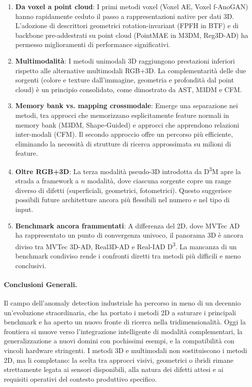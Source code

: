 \begin{enumerate}
    \item \textbf{Da voxel a point cloud}: I primi metodi voxel (Voxel AE, Voxel f-AnoGAN) hanno rapidamente ceduto il passo a rappresentazioni native per dati 3D. L'adozione di descrittori geometrici rotation-invariant (FPFH in BTF) e di backbone pre-addestrati su point cloud (PointMAE in M3DM, Reg3D-AD) ha permesso miglioramenti di performance significativi.

    \item \textbf{Multimodalità}: I metodi unimodali 3D raggiungono prestazioni inferiori rispetto alle alternative multimodali RGB+3D. La complementarità delle due sorgenti (colore e texture dall'immagine, geometria e profondità dal point cloud) è un principio consolidato, come dimostrato da AST, M3DM e CFM.

    \item \textbf{Memory bank vs. mapping crossmodale}: Emerge una separazione nei metodi, tra approcci che memorizzano esplicitamente feature normali in memory bank (M3DM, Shape-Guided) e approcci che apprendono relazioni inter-modali (CFM). Il secondo approccio offre un percorso più efficiente, eliminando la necessità di strutture di ricerca approssimata su milioni di feature.

    \item \textbf{Oltre RGB+3D}: La terza modalità pseudo-3D introdotta da D\textsuperscript{3}M apre la strada a framework a $n$ modalità, dove ciascuna sorgente copre un range diverso di difetti (superficiali, geometrici, fotometrici). Questo suggerisce possibili future architetture ancora più flessibili nel numero e nel tipo di input.

    \item \textbf{Benchmark ancora frammentati}: A differenza del 2D, dove MVTec AD ha rappresentato un punto di convergenza univoco, il panorama 3D è ancora diviso tra MVTec 3D-AD, Real3D-AD e Real-IAD D\textsuperscript{3}. La mancanza di un benchmark condiviso rende i confronti diretti tra metodi più difficili e meno conclusivi.
\end{enumerate}

\paragraph{Conclusioni Generali.}
Il campo dell'anomaly detection industriale ha percorso in meno di un decennio un'evoluzione straordinaria, che ha portato i metodi 2D a saturare i principali benchmark e ha aperto un nuovo fronte di ricerca nella tridimensionalità. Oggi la frontiera si muove verso l'integrazione intelligente di modalità complementari, la generalizzazione a nuovi domini con pochissimi esempi, e la compatibilità con vincoli hardware stringenti. I metodi 3D e multimodali non sostituiscono i metodi 2D, ma li completano: la scelta tra approcci visivi, geometrici o ibridi rimane strettamente legata ai sensori disponibili, alla natura dei difetti attesi e ai requisiti operativi del contesto produttivo specifico.
